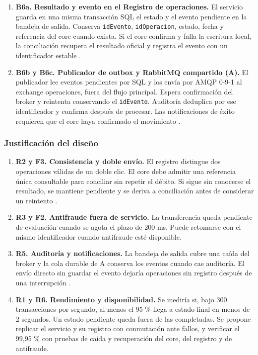\documentclass[12pt,a4paper]{article}
\begin{document}
\begin{enumerate}
    \item \textbf{B6a. Resultado y evento en el Registro de operaciones.}
    El servicio guarda en una misma transacción SQL el estado y el evento pendiente en la bandeja de salida. Conserva \texttt{idEvento}, \texttt{idOperacion}, estado, fecha y referencia del core cuando exista. Si el core confirma y falla la escritura local, la conciliación recupera el resultado oficial y registra el evento con un identificador estable \cite{awsoutbox}.

    \item \textbf{B6b y B6c. Publicador de outbox y RabbitMQ compartido (A).}
    El publicador lee eventos pendientes por SQL y los envía por AMQP 0-9-1 al exchange operaciones, fuera del flujo principal. Espera confirmación del broker y reintenta conservando el \texttt{idEvento}. Auditoría deduplica por ese identificador y confirma después de procesar. Las notificaciones de éxito requieren que el core haya confirmado el movimiento \cite{awsoutbox}.

\end{enumerate}

\subsubsection{Justificación del diseño}

\begin{enumerate}
    \item \textbf{R2 y F3. Consistencia y doble envío.}
    El registro distingue dos operaciones válidas de un doble clic. El core debe admitir una referencia única consultable para conciliar sin repetir el débito. Si sigue sin conocerse el resultado, se mantiene pendiente y se deriva a conciliación antes de considerar un reintento \cite{featonbyretries}.

    \item \textbf{R3 y F2. Antifraude fuera de servicio.}
    La transferencia queda pendiente de evaluación cuando se agota el plazo de 200 ms. Puede retomarse con el mismo identificador cuando antifraude esté disponible.

    \item \textbf{R5. Auditoría y notificaciones.}
    La bandeja de salida cubre una caída del broker y la cola durable de A conserva los eventos cuando cae auditoría. El envío directo sin guardar el evento dejaría operaciones sin registro después de una interrupción \cite{awsoutbox}.

    \item \textbf{R1 y R6. Rendimiento y disponibilidad.}
    Se mediría si, bajo 300 transacciones por segundo, al menos el 95 \% llega a estado final en menos de 2 segundos. Un estado pendiente queda fuera de las completadas. Se propone replicar el servicio y su registro con conmutación ante fallos, y verificar el 99,95 \% con pruebas de caída y recuperación del core, del registro y de antifraude.

\end{enumerate}
\end{document}
